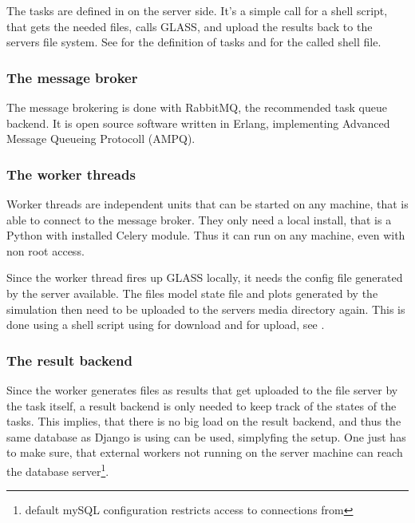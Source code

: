 
The tasks are defined in  on the server side.
It's a simple call for a shell script, that gets the needed files, calls GLASS, and upload the results back to the servers file system.
See  for the definition of tasks and  for the called shell file.



\subsubsection{The message broker}

The message brokering is done with RabbitMQ, the recommended task queue backend.
It is open source software written in Erlang, implementing Advanced Message Queueing Protocoll (AMPQ).

\subsubsection{The worker threads}

Worker threads are independent units that can be started on any machine, that is able to connect to the message broker. They only need a local install, that is a Python with installed Celery module.
Thus it can run on any machine, even with non root access.

Since the worker thread fires up GLASS locally, it needs the config file generated by the server available. The files model state file and plots generated by the simulation then need to be uploaded to the servers media directory again.
This is done using a shell script using  for download and  for upload, see .




\subsubsection{The result backend}
Since the worker generates files as results that get uploaded to the file server by the task itself, a result backend is only needed to keep track of the states of the tasks.
This implies, that there is no big load on the result backend, and thus the same database as Django is using can be used, simplyfing the setup.
One just has to make sure, that external workers not running on the server machine can reach the database server\footnote{default mySQL configuration restricts access to connections from }.




